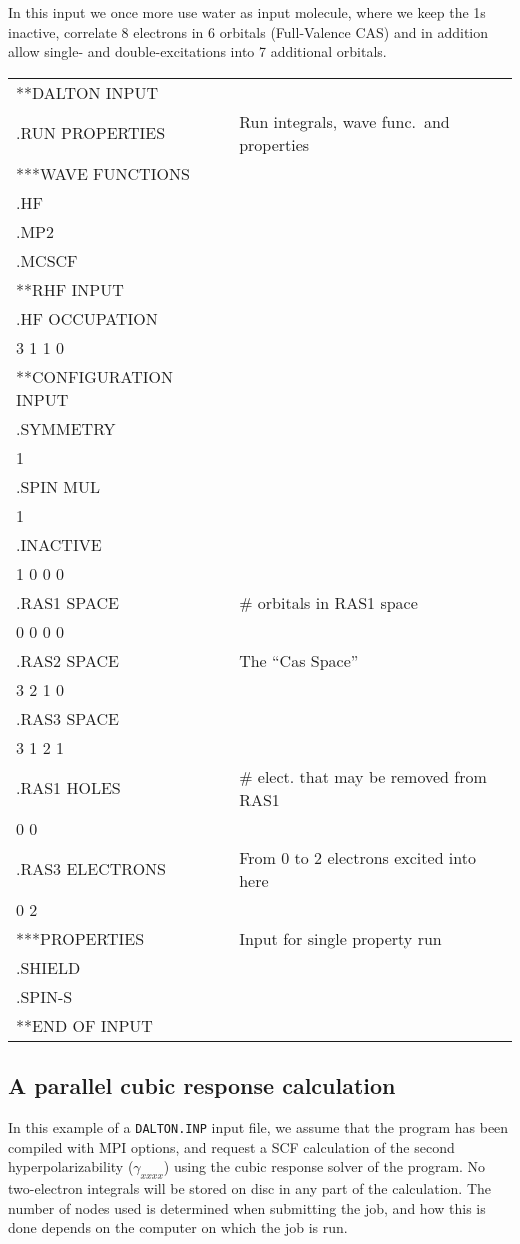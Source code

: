 In this input we once more use water as input molecule,
where we keep
the 1s inactive, correlate 8 electrons in 6 orbitals (Full-Valence
CAS) and in addition allow single- and double-excitations into
7 additional orbitals.

{\ttfamily
\begin{tabular}{ll}
**DALTON INPUT\\
.RUN PROPERTIES\hspace{2cm} & Run integrals, wave
func.\ and properties\\
***WAVE FUNCTIONS\\
.HF\\
.MP2\\
.MCSCF\\
**RHF INPUT\\
.HF OCCUPATION\\
 3 1 1 0\\
**CONFIGURATION INPUT\\
.SYMMETRY\\
 1\\
.SPIN MUL\\
 1\\
.INACTIVE\\
 1 0 0 0\\
.RAS1 SPACE & \# orbitals in RAS1 space\\
 0 0 0 0\\
.RAS2 SPACE & The ``Cas Space''\\
 3 2 1 0\\
.RAS3 SPACE\\
 3 1 2 1\\
.RAS1 HOLES & \# elect. that may be removed from RAS1\\
 0 0\\
.RAS3 ELECTRONS & From 0 to 2 electrons excited into here\\
 0 2\\
***PROPERTIES & Input for single property run\\
.SHIELD\\
.SPIN-S\\
**END OF INPUT\\
\end{tabular}}

\subsection{A parallel cubic response calculation}

In this example of a \verb|DALTON.INP| input file, we assume that
the program has been compiled with MPI options, and request a SCF
calculation of the second
hyperpolarizability
($\gamma_{xxxx}$) using
the cubic response solver
of the {\resp} program. No two-electron
integrals will be stored on disc in any part of the calculation. The
number of nodes used is determined when submitting the
job, and how
this is done depends on the computer on which the job is run.

